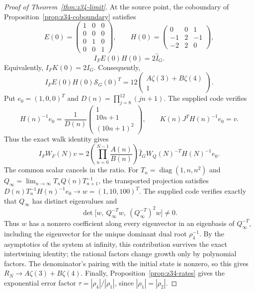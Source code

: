 \begin{proof}[Proof of Theorem~\ref{thm:z34-limit}]
At the source point, the coboundary of
Proposition~\ref{prop:z34-coboundary} satisfies
\[
E(0)=\begin{pmatrix}1&0&0\\0&0&0\\0&1&0\\0&0&1\end{pmatrix},
\qquad H(0)=\begin{pmatrix}0&0&1\\-1&2&-1\\-2&2&0\end{pmatrix},
\]
\[
I_FE(0)H(0)=2\widehat I_G.
\]
Equivalently, $I_FK(0)=2I_G$.
Consequently,
\[
I_FE(0)H(0)\widehat{\mathcal S}_G(0)^T
=12\begin{pmatrix}A\zeta(3)+B\zeta(4)\\1\end{pmatrix}.
\]
Put $e_0=(1,0,0)^T$ and $D(n)=\prod_{j=8}^{12}(jn+1)$.
The supplied code verifies
\[
H(n)^{-1}e_0=\frac{1}{D(n)}
\begin{pmatrix}1\\10n+1\\(10n+1)^2\end{pmatrix},
\qquad K(n)J^TH(n)^{-1}e_0=v.
\]
Thus the exact walk identity gives
\[
I_FW_F(N)v
=2\left(\prod_{n=0}^{N-1}\frac{A(n)}{B(n)}\right)
\widehat I_G W_Q(N)^{-T}H(N)^{-1}e_0.
\]
The common scalar cancels in the ratio. For
$T_n=\operatorname{diag}(1,n,n^2)$ and
$Q_\infty=\lim_{n\to\infty}T_nQ(n)T_{n+1}^{-1}$, the transported
projection satisfies $D(n)T_n^{-1}H(n)^{-1}e_0\to w=(1,10,100)^T$.
The supplied code verifies exactly that $Q_\infty$ has distinct
eigenvalues and
\[
\det\bigl[w,\ Q_\infty^{-T}w,\ (Q_\infty^{-T})^2w\bigr]\ne0.
\]
Thus $w$ has a nonzero coefficient along every eigenvector in an
eigenbasis of $Q_\infty^{-T}$, including the eigenvector for the unique
dominant dual root $\rho_4^{-1}$. By the asymptotics of the system at
infinity, this contribution survives the exact intertwining identity;
the rational factors change growth only by polynomial factors.
The denominator's pairing with the initial state is nonzero, so
this gives $R_N\to A\zeta(3)+B\zeta(4)$.
Finally, Proposition~\ref{prop:z34-rates} gives the exponential error
factor $\tau=|\rho_4|/|\rho_1|$, since $|\rho_1|=|\rho_2|$.
\end{proof}

